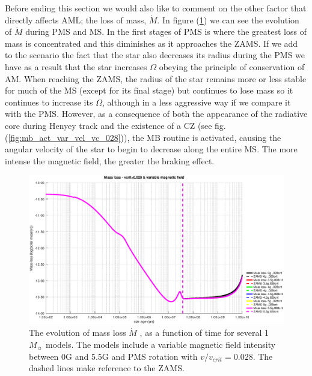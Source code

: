 \documentclass[fleqn,usenatbib]{mnras}
\begin{document}
Before ending this section we would also like to comment on the other factor that directly affects AML; the loss of mass, $\Dot{M}$. In figure (\ref{fig:mdot_vc_028_var_b}) we can see the evolution of $\Dot{M}$ during PMS and MS. In the first stages of PMS is where the greatest loss of mass is concentrated and this diminishes as it approaches the ZAMS. If we add to the scenario the fact that the star also decreases its radius during the PMS we have as a result that the star increases $\Omega$ obeying the principle of conservation of AM. When reaching the ZAMS, the radius of the star remains more or less stable for much of the MS (except for its final stage) but continues to lose mass so it continues to increase its $\Omega$, although in a less aggressive way if we compare it with the PMS. However, as a consequence of both the appearance of the radiative core during Henyey track and the existence of a CZ (see fig. (\ref{fig:mb_act_var_vel_vc_028})), the MB routine is activated, causing the angular velocity of the star to begin to decrease along the entire MS. The more intense the magnetic field, the greater the braking effect.\par 

\begin{figure}
	\includegraphics[width=\columnwidth]{figures/mdot_vc_028_var_b.eps}
    \caption{The evolution of mass loss $\Dot{M}$ , as a function of time for several 1 $M_{\sun}$ models. The models include a variable magnetic field intensity between 0G and 5.5G and PMS rotation with $v/v_{crit}=0.028$. The dashed lines make reference to the ZAMS.}
    \label{fig:mdot_vc_028_var_b}
\end{figure}
\end{document}

